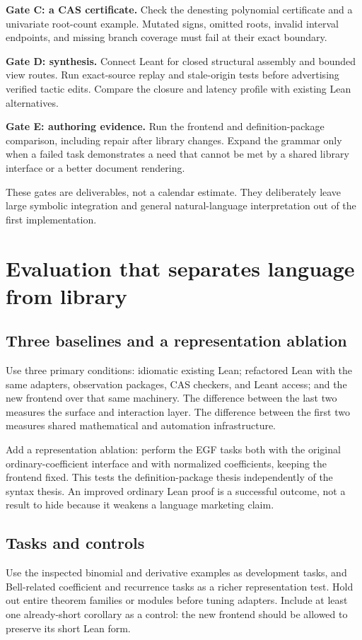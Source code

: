 \documentclass[11pt,a4paper]{article}
\theoremstyle{definition}
\begin{document}
\textbf{Gate C: a CAS certificate.} Check the denesting polynomial certificate
and a univariate root-count example. Mutated signs, omitted roots, invalid
interval endpoints, and missing branch coverage must fail at their exact boundary.

\textbf{Gate D: synthesis.} Connect Leant for closed structural assembly and
bounded view routes. Run exact-source replay and stale-origin tests before
advertising verified tactic edits. Compare the closure and latency profile with
existing Lean alternatives.

\textbf{Gate E: authoring evidence.} Run the frontend and definition-package
comparison, including repair after library changes. Expand the grammar only
when a failed task demonstrates a need that cannot be met by a shared library
interface or a better document rendering.

These gates are deliverables, not a calendar estimate. They deliberately leave
large symbolic integration and general natural-language interpretation out of
the first implementation.

\section{Evaluation that separates language from library}\label{sec:evaluation}
\subsection{Three baselines and a representation ablation}
Use three primary conditions: idiomatic existing Lean; refactored Lean with the
same adapters, observation packages, CAS checkers, and Leant access; and the new
frontend over that same machinery. The difference between the last two measures
the surface and interaction layer. The difference between the first two measures
shared mathematical and automation infrastructure.

Add a representation ablation: perform the EGF tasks both with the original
ordinary-coefficient interface and with normalized coefficients, keeping the
frontend fixed. This tests the definition-package thesis independently of the
syntax thesis. An improved ordinary Lean proof is a successful outcome, not a
result to hide because it weakens a language marketing claim.

\subsection{Tasks and controls}
Use the inspected binomial and derivative examples as development tasks, and
Bell-related coefficient and recurrence tasks as a richer representation test.
Hold out entire theorem families or modules before tuning adapters. Include at
least one already-short corollary as a control: the new frontend should be
allowed to preserve its short Lean form.
\end{document}
